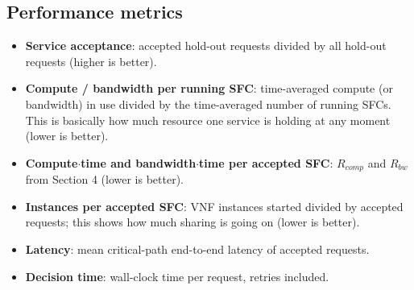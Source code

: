 \documentclass[11pt,a4paper]{article}
\begin{document}
\subsection{Performance metrics}
\begin{itemize}
  \item \textbf{Service acceptance}: accepted hold-out requests divided by all
  hold-out requests (higher is better).
  \item \textbf{Compute / bandwidth per running SFC}: time-averaged compute (or
  bandwidth) in use divided by the time-averaged number of running SFCs. This is
  basically how much resource one service is holding at any moment (lower is
  better).
  \item \textbf{Compute$\cdot$time and bandwidth$\cdot$time per accepted SFC}:
  $R_{comp}$ and $R_{bw}$ from Section 4 (lower is better).
  \item \textbf{Instances per accepted SFC}: VNF instances started divided by
  accepted requests; this shows how much sharing is going on (lower is better).
  \item \textbf{Latency}: mean critical-path end-to-end latency of accepted
  requests.
  \item \textbf{Decision time}: wall-clock time per request, retries included.
\end{itemize}
\end{document}
